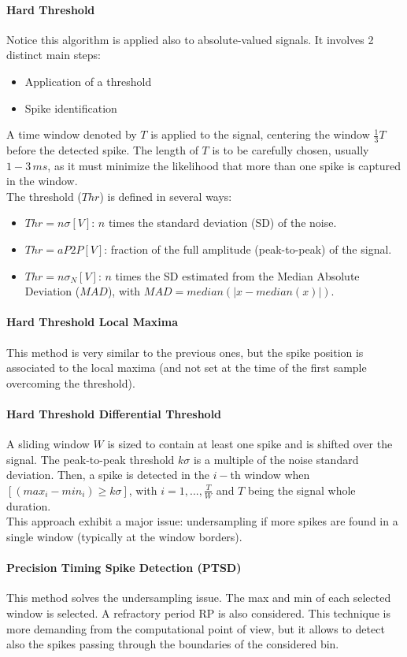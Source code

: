 \paragraph{Hard Threshold} Notice this algorithm is applied also to
absolute-valued signals. It involves 2 distinct main steps:
\begin{itemize}
    \item Application of a threshold
    \item Spike identification
\end{itemize}
A time window denoted by \(T\) is applied to the signal, centering the window
\(\frac{1}{3}T\) before the detected spike. The length of \(T\) is to be
carefully chosen, usually \(1-3\,ms\), as it must minimize the likelihood that
more than one spike is captured in the window.\\
The threshold (\(Thr\)) is defined in several ways:
\begin{itemize}
    \item \(Thr=n\sigma[V]\): \(n\) times the standard deviation (SD) of
    the noise.
    \item \(Thr=aP2P[V]\): fraction of the full amplitude (peak-to-peak) of
    the signal.
    \item \(Thr=n\sigma_N[V]\): \(n\) times the SD estimated from the Median
    Absolute Deviation (\(MAD\)), with \(MAD=median(|x-median(x)|)\).
\end{itemize}
\paragraph{Hard Threshold Local Maxima}
This method is very similar to the previous ones, but the spike position is
associated to the local maxima (and not set at the time of the first sample
overcoming the threshold).
\paragraph{Hard Threshold Differential Threshold}
A sliding window \(W\) is sized to contain at least one spike and is shifted
over the signal. The peak-to-peak threshold \(k\sigma\) is a multiple of the
noise standard deviation. Then, a spike is detected in the \(i-\)th window
when \([(max_i-min_i)\ge{k\sigma}]\), with \(i=1,...,\frac{T}{W}\) and \(T\)
being the signal whole duration.\\
This approach exhibit a major issue: undersampling if more spikes are found in
a single window (typically at the window borders).
\paragraph{Precision Timing Spike Detection (PTSD)}
This method solves the undersampling issue. The max and min of each selected
window is selected. A refractory period RP is also considered. This technique
is more demanding from the computational point of view, but it allows to detect
also the spikes passing through the boundaries of the considered bin.
